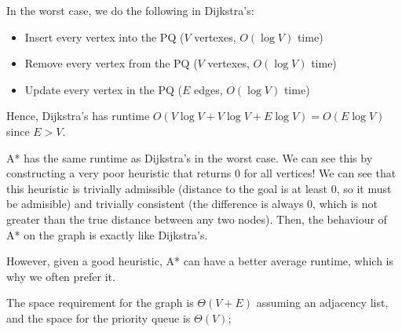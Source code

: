 \begin{parts}
\begin{solution}
  In the worst case, we do the following in Dijkstra's:
  \begin{itemize}
    \item Insert every vertex into the PQ ($V$ vertexes, $O(\log{V})$ time)
    \item Remove every vertex from the PQ ($V$ vertexes, $O(\log{V})$ time)
    \item Update every vertex in the PQ ($E$ edges, $O(\log{V})$ time)
  \end{itemize}
  Hence, Dijkstra's has runtime $O(V\log{V} + V\log{V} + E\log{V}) = O(E\log{V})$ since $E > V$.

  A* has the same runtime as Dijkstra's in the worst case. We can see this by constructing a very poor heuristic that returns $0$ for all vertices! We can see that this heuristic is trivially admissible (distance to the goal is at least 0, so it must be admisible) and trivially consistent (the difference is always 0, which is not greater than the true distance between any two nodes). Then, the behaviour of A* on the graph is exactly like Dijkstra's.

  However, given a good heuristic, A* can have a better average runtime, which is why we often prefer it.

  The space requirement for the graph is $\Theta(V + E)$ assuming an adjacency list, and the space for the priority queue is $\Theta(V)$;
\end{solution}
\end{parts}
